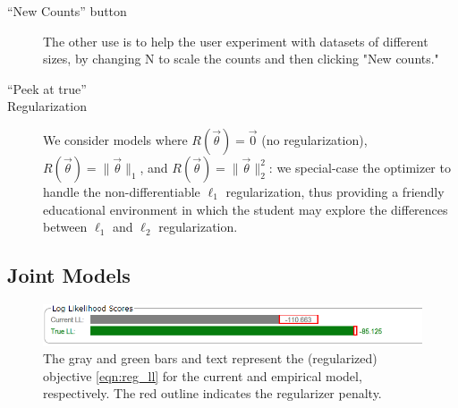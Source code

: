 \documentclass[11pt,letterpaper]{article}
\begin{document}
\begin{description}
\item[``New Counts'' button] The other use is to help the user experiment with datasets of different sizes, by changing N to scale the counts and then clicking "New counts."
\item[``Peek at true'']
\item[Regularization] We consider models where $R(\vec{\theta}) = \vec{0}$ (no regularization), $R(\vec{\theta}) = \|\vec\theta\|_1$, and $R(\vec{\theta}) = \|\vec{\theta}\|_2^2$: we special-case the optimizer to handle the non-differentiable $\ell_1$ regularization, thus providing a friendly educational environment in which the student may explore the differences between $\ell_1$ and $\ell_2$ regularization.
\end{description}

\subsection{Joint Models} \label{sec:jointlessons}
\begin{figure}[t]
\centering
\includegraphics[scale=.3]{images/regularized_ll_bar_andtrue_cut.PNG}

\caption{The gray and green bars and text represent the (regularized) objective
 \eqref{eqn:reg_ll} for the current and empirical model, respectively. The red 
outline indicates the regularizer penalty.}
\label{fig:llbar}
\end{figure}
\end{document}
